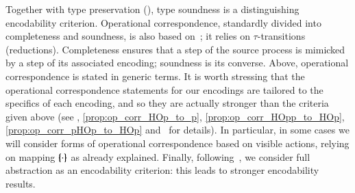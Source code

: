 \documentclass[preprint,11pt]{elsarticle}
\newtheorem{proposition}{Proposition}[section]
\begin{document}
{%
Together with type preservation (), type soundness is a distinguishing encodability criterion.
Operational correspondence, standardly divided into completeness and soundness, is also based
on~\cite{DBLP:journals/iandc/Gorla10};
it relies on 
$\tau$-transitions (reductions).
Completeness ensures that a step of the source process is mimicked
by a step of its associated encoding; soundness is its converse.
{Above, operational correspondence is stated in generic terms.}
It is worth stressing that 
the operational correspondence statements 
for our encodings 
 are tailored to the specifics of each encoding, and so they
 are actually stronger than the criteria given above
 {(see , \ref{prop:op_corr_HOp_to_p}, \ref{prop:op_corr_HOpp_to_HOp}, \ref{prop:op_corr_pHOp_to_HOp}
 and~\cite{KouzapasPY15} for details).}
 In particular, in some cases we will consider forms of operational correspondence based on visible actions, relying on 
 mapping $\{\!\!\{\cdot\}\!\!\}$ as already explained.
Finally, following~\cite{SangiorgiD:expmpa,DBLP:conf/lics/PalamidessiSVV06,Yoshida96},
we consider full abstraction as an encodability criterion: this leads to 
stronger encodability results. 

%
%


}
\end{document}
